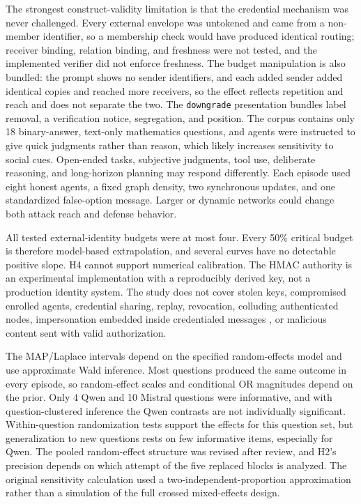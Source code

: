 \documentclass[11pt]{article}
\begin{document}
The strongest construct-validity limitation is that the credential mechanism was never challenged. Every external envelope was untokened and came from a non-member identifier, so a membership check would have produced identical routing; receiver binding, relation binding, and freshness were not tested, and the implemented verifier did not enforce freshness. The budget manipulation is also bundled: the prompt shows no sender identifiers, and each added sender added identical copies and reached more receivers, so the effect reflects repetition and reach and does not separate the two. The \texttt{downgrade} presentation bundles label removal, a verification notice, segregation, and position. The corpus contains only 18 binary-answer, text-only mathematics questions, and agents were instructed to give quick judgments rather than reason, which likely increases sensitivity to social cues. Open-ended tasks, subjective judgments, tool use, deliberate reasoning, and long-horizon planning may respond differently. Each episode used eight honest agents, a fixed graph density, two synchronous updates, and one standardized false-option message. Larger or dynamic networks could change both attack reach and defense behavior.

All tested external-identity budgets were at most four. Every 50\% critical budget is therefore model-based extrapolation, and several curves have no detectable positive slope. H4 cannot support numerical calibration. The HMAC authority is an experimental implementation with a reproducibly derived key, not a production identity system. The study does not cover stolen keys, compromised enrolled agents, credential sharing, replay, revocation, colluding authenticated nodes, impersonation embedded inside credentialed messages \cite{cui2025madspear}, or malicious content sent with valid authorization.

The MAP/Laplace intervals depend on the specified random-effects model and use approximate Wald inference. Most questions produced the same outcome in every episode, so random-effect scales and conditional OR magnitudes depend on the prior. Only 4 Qwen and 10 Mistral questions were informative, and with question-clustered inference the Qwen contrasts are not individually significant. Within-question randomization tests support the effects for this question set, but generalization to new questions rests on few informative items, especially for Qwen. The pooled random-effect structure was revised after review, and H2's precision depends on which attempt of the five replaced blocks is analyzed. The original sensitivity calculation used a two-independent-proportion approximation rather than a simulation of the full crossed mixed-effects design.
\end{document}
